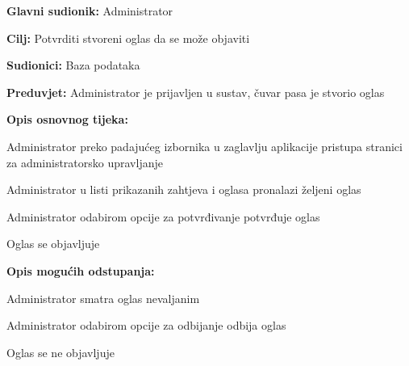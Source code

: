 					\noindent {}
					\begin{packed_item}
						
						\item \textbf{Glavni sudionik: } Administrator
						\item  \textbf{Cilj:} Potvrditi stvoreni oglas da se može objaviti
						\item  \textbf{Sudionici:} Baza podataka
						\item  \textbf{Preduvjet:} Administrator je prijavljen u sustav, čuvar pasa je stvorio oglas
						\item  \textbf{Opis osnovnog tijeka:}
						
						\item[] \begin{packed_enum}
							
							\item Administrator preko padajućeg izbornika u zaglavlju aplikacije pristupa stranici za administratorsko upravljanje
							\item Administrator u listi prikazanih zahtjeva i oglasa pronalazi željeni oglas
							\item Administrator odabirom opcije za potvrđivanje potvrđuje oglas
							\item Oglas se objavljuje
							
						\end{packed_enum}
						\item  \textbf{Opis mogućih odstupanja:}
						
						\item[] \begin{packed_item}
							
							\item[3.a] Administrator smatra oglas nevaljanim
							\item[] \begin{packed_enum}
								
								\item Administrator odabirom opcije za odbijanje odbija oglas
								\item Oglas se ne objavljuje
								
							\end{packed_enum}
							
						\end{packed_item}
					\end{packed_item}
					
